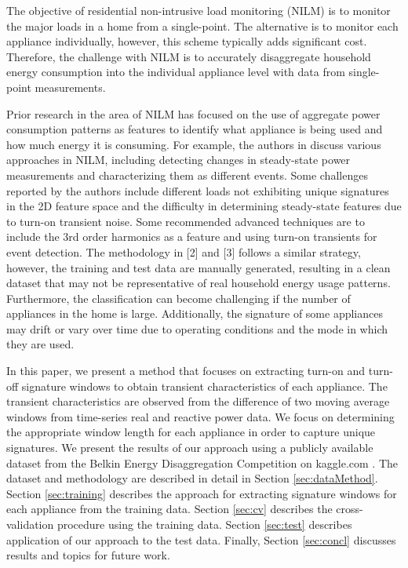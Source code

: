 \documentclass[conference]{IEEEtran}
\begin{document}
The objective of residential non-intrusive load monitoring (NILM) is to monitor the major loads in a home from a single-point.  The alternative is to monitor each appliance individually, however, this scheme typically adds significant cost. Therefore, the challenge with NILM is to accurately disaggregate household energy consumption into the individual appliance level with data from single-point measurements.  

Prior research in the area of NILM has focused on the use of aggregate power consumption patterns as features to identify what appliance is being used and how much energy it is consuming. For example, the authors in \cite{mit} discuss various approaches in NILM, including detecting changes in steady-state power measurements and characterizing them as different events. Some challenges reported by the authors include different loads not exhibiting unique signatures in the 2D feature space and the difficulty in determining steady-state features due to turn-on transient noise.  Some recommended advanced techniques are to include the 3rd order harmonics as a feature and using turn-on transients for event detection.  The methodology in [2] and [3] follows a similar strategy, however, the training and test data are manually generated, resulting in a clean dataset that may not be representative of real household energy usage patterns.  Furthermore, the classification can become challenging if the number of appliances in the home is large. Additionally, the signature of some appliances may drift or vary over time due to operating conditions and the mode in which they are used. 

In this paper, we present a method that focuses on extracting turn-on and turn-off signature windows to obtain transient characteristics of each appliance.  The transient characteristics are observed from the difference of two moving average windows from time-series real and reactive power data.  We focus on determining the appropriate window length for each appliance in order to capture unique signatures.  We present the results of our approach using a publicly available dataset from the Belkin Energy Disaggregation Competition on kaggle.com \cite{Kaggle}. The dataset and methodology are described in detail in Section \ref{sec:dataMethod}.  Section \ref{sec:training} describes the approach for extracting signature windows for each appliance from the training data. Section \ref{sec:cv} describes the cross-validation procedure using the training data.  Section \ref{sec:test} describes application of our approach to the test data.  Finally, Section \ref{sec:concl} discusses results and topics for future work.
\end{document}

